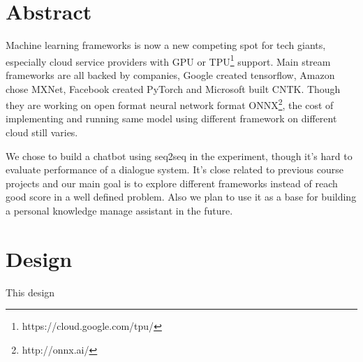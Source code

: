 \documentclass[11pt,letterpaper,twocolumn,oneside]{article}
\begin{document}

\section{Abstract}

Machine learning frameworks is now a new competing spot for tech giants,
especially cloud service providers with GPU or TPU\footnote{https://cloud.google.com/tpu/} support.
Main stream frameworks are all backed by companies,
Google created tensorflow, Amazon chose MXNet, Facebook created PyTorch and Microsoft built CNTK.
Though they are working on open format neural network format ONNX\footnote{http://onnx.ai/},
the cost of implementing and running same model using different framework on different cloud still varies.

We chose to build a chatbot using seq2seq in the experiment,
though it's hard to evaluate performance of a dialogue system\cite{liu2016not}.
It's close related to previous course projects and our main goal is to explore different frameworks
instead of reach good score in a well defined problem.
Also we plan to use it as a base for building a personal knowledge manage assistant in the future.

\section{Design}

This design

\printbibliography
\end{document}
